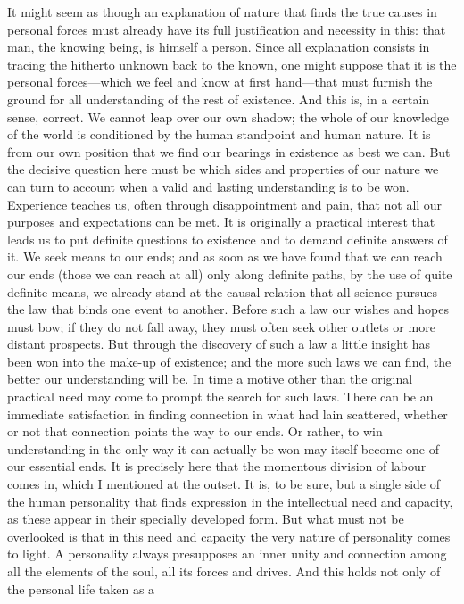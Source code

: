 \documentclass[12pt,a4paper]{article}
\newcommand{\opage}[1]{\marginnote{\footnotesize\textit{[#1]}}}
\begin{document}
It might seem as though an explanation of nature that finds the true causes in
personal forces must already have its full justification and necessity in this:
that \opage{22}man, the knowing being, is himself a person. Since all explanation consists in
tracing the hitherto unknown back to the known, one might suppose that it is the
personal forces---which we feel and know at first hand---that must furnish the
ground for all understanding of the rest of existence. And this is, in a certain
sense, correct. We cannot leap over our own shadow; the whole of our knowledge of
the world is conditioned by the human standpoint and human nature. It is from our
own position that we find our bearings in existence as best we can. But the decisive
question here must be which sides and properties of our nature we can turn to
account when a valid and lasting understanding is to be won. Experience teaches us,
often through disappointment and pain, that not all our purposes and expectations
can be met. It is originally a practical interest that leads us to put definite
questions to existence and to demand definite answers of it. We seek means to our
ends; and as soon as we have found that we can reach our ends (those we can reach at
all) only along definite paths, by the use of quite definite means, we already stand
at the causal relation that all science pursues---the law that binds one event to
another. Before such a law our wishes and hopes must bow; if they do not fall away,
they must often seek other outlets or more distant prospects. But through the
discovery of such a law a little insight has been won into the make-up of existence;
and the more such laws we can find, the better our understanding will be. In time a
motive other than the original practical need may come to prompt the search for such
laws. There can be an immediate satisfaction in finding connection in what had lain
scattered, whether or not that connection points the way to our ends. \opage{23}Or rather, to
win understanding in the only way it can actually be won may itself become one of our
essential ends. It is precisely here that the momentous division of labour comes in,
which I mentioned at the outset. It is, to be sure, but a single side of the human
personality that finds expression in the intellectual need and capacity, as these
appear in their specially developed form. But what must not be overlooked is that in
this need and capacity the very nature of personality comes to light. A personality
always presupposes an inner unity and connection among all the elements of the soul,
all its forces and drives. And this holds not only of the personal life taken as a
\end{document}
